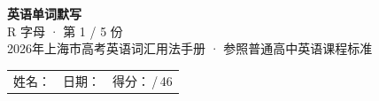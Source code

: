 \documentclass[10pt,a4paper]{article}
\begin{document}
\pagestyle{plain}

\begin{center}
{\LARGE\bfseries 英语单词默写}\\[0.22em]
{\large R 字母 · 第 1 / 5 份}\\[0.18em]
{\small 2026年上海市高考英语词汇用法手册 · 参照普通高中英语课程标准}
\end{center}

\vspace{0.25em}
\noindent\begin{tabular}{@{}p{}@{}p{}@{}p{}@{}}
姓名：\underline{\hspace{2.0cm}} & 日期：\underline{\hspace{2.0cm}} & 得分：\underline{\hspace{1.3cm}}\,/\,46 \\
\end{tabular}

\vspace{0.3em}

\vspace{0.08em}
\end{document}
